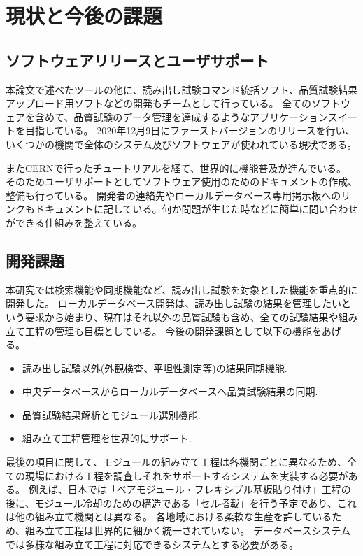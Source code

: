 \section{現状と今後の課題}
\subsection{ソフトウェアリリースとユーザサポート}
本論文で述べたツールの他に、読み出し試験コマンド統括ソフト、品質試験結果アップロード用ソフトなどの開発もチームとして行っている。
全てのソフトウェアを含めて、品質試験のデータ管理を達成するようなアプリケーションスイートを目指している。
2020年12月9日にファーストバージョンのリリースを行い、いくつかの機関で全体のシステム及びソフトウェアが使われている現状である。

またCERNで行ったチュートリアルを経て、世界的に機能普及が進んでいる。
そのためユーザサポートとしてソフトウェア使用のためのドキュメント\cite{7-1}の作成、整備も行っている。
開発者の連絡先やローカルデータベース専用掲示板へのリンクもドキュメントに記している。何か問題が生じた時などに簡単に問い合わせができる仕組みを整えている。

\subsection{開発課題}
本研究では検索機能や同期機能など、読み出し試験を対象とした機能を重点的に開発した。
ローカルデータベース開発は、読み出し試験の結果を管理したいという要求から始まり、現在はそれ以外の品質試験も含め、全ての試験結果や組み立て工程の管理も目標としている。
今後の開発課題として以下の機能をあげる。
\begin{itemize}
  \item 読み出し試験以外(外観検査、平坦性測定等)の結果同期機能.
  \item 中央データベースからローカルデータベースへ品質試験結果の同期.
  \item 品質試験結果解析とモジュール選別機能. 
  \item 組み立て工程管理を世界的にサポート.
\end{itemize}

最後の項目に関して、モジュールの組み立て工程は各機関ごとに異なるため、全ての現場における工程を調査しそれをサポートするシステムを実装する必要がある。
例えば、日本では「ベアモジュール・フレキシブル基板貼り付け」工程の後に、モジュール冷却のための構造である「セル搭載」を行う予定であり、これは他の組み立て機関とは異なる。
各地域における柔軟な生産を許しているため、組み立て工程は世界的に細かく統一されていない。
データベースシステムでは多様な組み立て工程に対応できるシステムとする必要がある。

